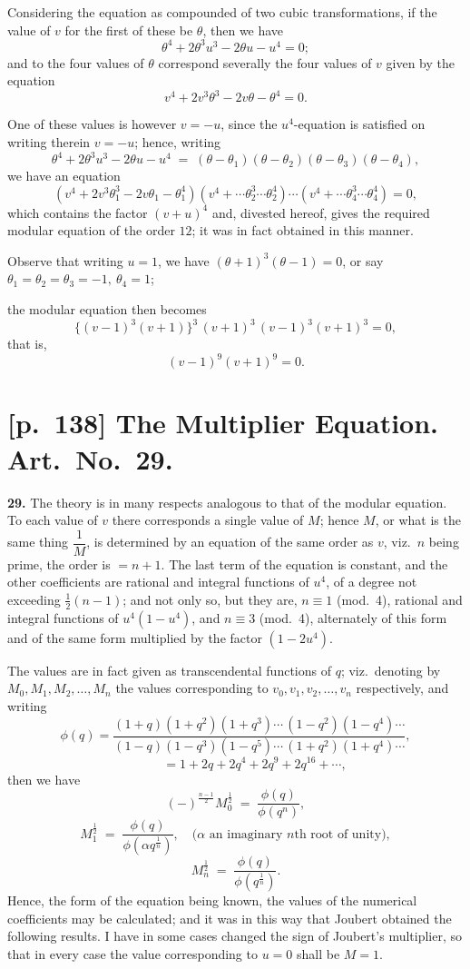 \documentclass[11pt]{article}
\begin{document}
Considering the equation as compounded of two cubic transformations, if the
value of $v$ for the first of these be $\theta$, then we have
\[
\theta^4 + 2\theta^3 u^3 - 2\theta u - u^4 = 0;
\]
and to the four values of $\theta$ correspond severally the four values of
$v$ given by the equation
\[
v^4 + 2 v^3 \theta^3 - 2 v \theta - \theta^4 = 0.
\]

One of these values is however $v = -u$, since the $u^4$-equation is
satisfied on writing therein $v = -u$; hence, writing
\[
\theta^4 + 2\theta^3 u^3 - 2\theta u - u^4 \;=\; (\theta - \theta_1)(\theta - \theta_2)(\theta - \theta_3)(\theta - \theta_4),
\]
we have an equation
\[
(v^4 + 2 v^3 \theta_1^3 - 2 v \theta_1 - \theta_1^4)(v^4 + \cdots\theta_2^3\cdots\theta_2^4)\cdots
(v^4 + \cdots\theta_4^3\cdots\theta_4^4) = 0,
\]
which contains the factor $(v + u)^4$ and, divested hereof, gives the
required modular equation of the order $12$; it was in fact obtained in
this manner.

Observe that writing $u=1$, we have $(\theta + 1)^3(\theta - 1) = 0$, or say
$\theta_1 = \theta_2 = \theta_3 = -1,\ \theta_4 = 1$;

the modular equation then becomes
\[
\{(v - 1)^3(v + 1)\}^3\,(v + 1)^3\,(v - 1)^3(v + 1)^3 = 0,
\]
that is,
\[
(v - 1)^9(v + 1)^9 = 0.
\]

\clearpage
\section*{[p.~138] The Multiplier Equation. Art.\ No.\ 29.}

\textbf{29.} The theory is in many respects analogous to that of the
modular equation. To each value of $v$ there corresponds a single value of
$M$; hence $M$, or what is the same thing $\dfrac{1}{M}$, is determined by
an equation of the same order as $v$, viz.\ $n$ being prime, the order is
$=n+1$. The last term of the equation is constant, and the other
coefficients are rational and integral functions of $u^4$, of a degree not
exceeding $\tfrac{1}{2}(n-1)$; and not only so, but they are,
$n \equiv 1$ (mod.\ 4), rational and integral functions of $u^4(1 - u^4)$,
and $n \equiv 3$ (mod.\ 4), alternately of this form and of the same form
multiplied by the factor $(1 - 2u^4)$.

The values are in fact given as transcendental functions of $q$; viz.\
denoting by $M_0, M_1, M_2, \ldots, M_n$ the values corresponding to
$v_0, v_1, v_2, \ldots, v_n$ respectively, and writing
\[
\phi(q) = \frac{(1+q)(1+q^2)(1+q^3)\cdots\,(1 - q^2)(1-q^4)\cdots}
              {(1-q)(1-q^3)(1-q^5)\cdots\,(1+q^2)(1+q^4)\cdots},
\]
\[
\quad\quad\quad = 1 + 2q + 2q^4 + 2q^9 + 2q^{16} + \cdots,
\]
then we have
\[
(-)^{\frac{n-1}{2}} M_0^{\frac{1}{2}} \;=\; \frac{\phi(q)}{\phi(q^n)},
\]
\[
M_1^{\frac{1}{2}} \;=\; \frac{\phi(q)}{\phi(\alpha q^{\frac{1}{n}})},
\quad\text{($\alpha$ an imaginary $n$th root of unity)},
\]
\[
M_n^{\frac{1}{2}} \;=\; \frac{\phi(q)}{\phi(q^{\frac{1}{n}})}.
\]
Hence, the form of the equation being known, the values of the numerical
coefficients may be calculated; and it was in this way that Joubert
obtained the following results. I have in some cases changed the sign of
Joubert's multiplier, so that in every case the value corresponding to
$u=0$ shall be $M=1$.
\end{document}
